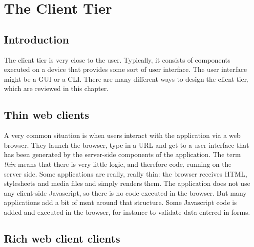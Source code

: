 \chapter{The Client Tier}
\label{ch:client-tier}

\section{Introduction}

The client tier is very close to the user. Typically, it consists of components executed on a device that provides some sort of user interface. The user interface might be a \ac{GUI} or a \ac{CLI}. There are many different ways to design the client tier, which are reviewed in this chapter.

\section{Thin web clients}


A very common situation is when users interact with the application via a web browser. They launch the browser, type in a URL and get to a user interface that has been generated by the server-side components of the application. The term \emph{thin} means that there is very little logic, and therefore code, running on the server side. Some applications are really, really thin: the browser receives HTML, stylesheets and media files and simply renders them. The application does not use any client-side Javascript, so there is no code executed in the browser. But many applications add a bit of meat around that structure. Some Javascript code is added and executed in the browser, for instance to validate data entered in forms.

\section{Rich web client clients}


